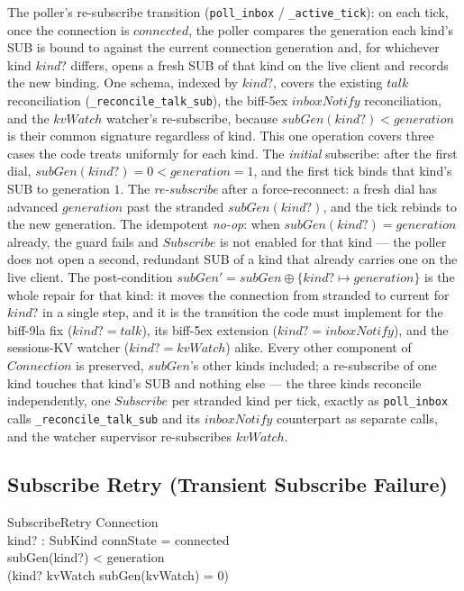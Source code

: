 \documentclass[a4paper,10pt,fleqn]{article}
\begin{document}
The poller's re-subscribe transition
(\texttt{poll\_inbox} / \texttt{\_active\_tick}): on each tick, once the
connection is $connected$, the poller compares the generation each kind's
SUB is bound to against the current connection generation and, for
whichever kind $kind?$ differs, opens a fresh SUB of that kind on the live
client and records the new binding.  One schema, indexed by $kind?$,
covers the existing $talk$ reconciliation (\texttt{\_reconcile\_talk\_sub}),
the biff-5ex $inboxNotify$ reconciliation, and the $kvWatch$
watcher's re-subscribe, because $subGen(kind?) < generation$ is their common signature
regardless of kind.  This one operation covers three cases the code
treats uniformly for each kind.  The \emph{initial} subscribe: after
the first dial, $subGen(kind?) = 0 < generation = 1$, and the first tick
binds that kind's SUB to generation $1$.  The \emph{re-subscribe} after a
force-reconnect: a fresh dial has advanced $generation$ past the stranded
$subGen(kind?)$, and the tick rebinds to the new generation.  The
idempotent \emph{no-op}: when $subGen(kind?) = generation$ already, the
guard fails and $Subscribe$ is not enabled for that kind --- the poller
does not open a second, redundant SUB of a kind that already carries one
on the live client.  The post-condition $subGen' = subGen \oplus \{
kind? \mapsto generation \}$ is the whole repair for that kind: it moves
the connection from stranded to current for $kind?$ in a single step, and
it is the transition the code must implement for the biff-9la fix
($kind? = talk$), its biff-5ex extension ($kind? = inboxNotify$), and the
sessions-KV watcher ($kind? = kvWatch$) alike.  Every other component of $Connection$ is preserved, $subGen$'s
other kinds included; a re-subscribe of one kind touches that kind's SUB
and nothing else --- the three kinds reconcile independently, one
$Subscribe$ per stranded kind per tick, exactly as \texttt{poll\_inbox}
calls \texttt{\_reconcile\_talk\_sub} and its $inboxNotify$ counterpart
as separate calls, and the watcher supervisor re-subscribes $kvWatch$.

\subsection{Subscribe Retry (Transient Subscribe Failure)}

\begin{schema}{SubscribeRetry}
  \Xi Connection \\
  kind? : SubKind
  \where
  connState = connected \\
  subGen(kind?) < generation \\
  (kind? \neq kvWatch \lor subGen(kvWatch) = 0)
\end{schema}
\end{document}
